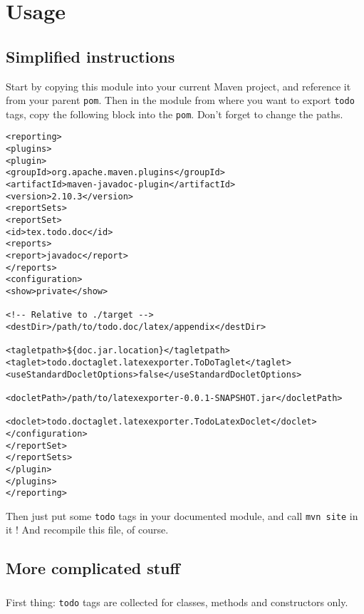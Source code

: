 \documentclass[10pt,onecolumn]{report}
\begin{document}


\tableofcontents

\chapter{Usage}

\section{Simplified instructions}

Start by copying this module into your current \textsf{Maven} project, and reference it
from your parent \verb!pom!. Then in the module from where you want to export \verb!todo! 
tags, copy the following block into the \verb!pom!. Don't forget to change the paths.

\begin{framed}
\begin{verbatim}
<reporting>
<plugins>
<plugin>
<groupId>org.apache.maven.plugins</groupId>
<artifactId>maven-javadoc-plugin</artifactId>
<version>2.10.3</version>
<reportSets>
<reportSet>
<id>tex.todo.doc</id>
<reports>
<report>javadoc</report>
</reports>
<configuration>
<show>private</show>

<!-- Relative to ./target -->
<destDir>/path/to/todo.doc/latex/appendix</destDir>

<tagletpath>${doc.jar.location}</tagletpath>
<taglet>todo.doctaglet.latexexporter.ToDoTaglet</taglet>
<useStandardDocletOptions>false</useStandardDocletOptions>

<docletPath>/path/to/latexexporter-0.0.1-SNAPSHOT.jar</docletPath>

<doclet>todo.doctaglet.latexexporter.TodoLatexDoclet</doclet>
</configuration>
</reportSet>
</reportSets>
</plugin>
</plugins>
</reporting>
\end{verbatim}
\end{framed}

Then just put some \verb!todo! tags in your documented module, and call
\verb!mvn site! in it ! And recompile this file, of course.

\section{More complicated stuff}

\paragraph{}
First thing: \verb!todo! tags are collected for classes, methods and 
constructors only.
\end{document}
